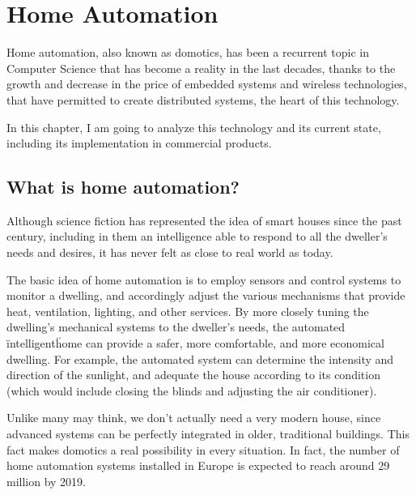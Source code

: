 \chapter{Home Automation}

Home automation, also known as domotics, has been a recurrent topic in Computer Science that
has become a reality in the last decades, thanks to the growth and decrease in the price of embedded
systems and wireless technologies, that have permitted to create distributed systems, the heart of this technology.

\bigskip
In this chapter, I am going to analyze this technology and its current state, including its implementation in commercial
products.

\section{What is home automation?}

Although science fiction has represented the idea of smart houses since the past century, including in them
an intelligence able to respond to all the dweller’s needs and desires, it has never felt as close to real world as today.

\bigskip
The basic idea of home automation is to employ sensors and control systems to monitor a dwelling, and accordingly 
adjust the various mechanisms that provide heat, ventilation, lighting, and other services. By more closely tuning the 
dwelling’s mechanical systems to the dweller’s needs, the automated \"intelligent\" home can provide a safer, more 
comfortable, and more economical dwelling.\cite{smarthouse98} For example, the automated system can determine 
the intensity and direction of the sunlight, and adequate the house according to its condition (which would include
closing the blinds and adjusting the air conditioner).

\bigskip
Unlike many may think, we don't actually need a very modern house, since advanced systems can be perfectly integrated 
in older, traditional buildings. This fact makes domotics a real possibility in every situation. In fact, the number of home 
automation systems installed in Europe is expected to reach around 29 million by 2019.\cite{statistaInstalled}

